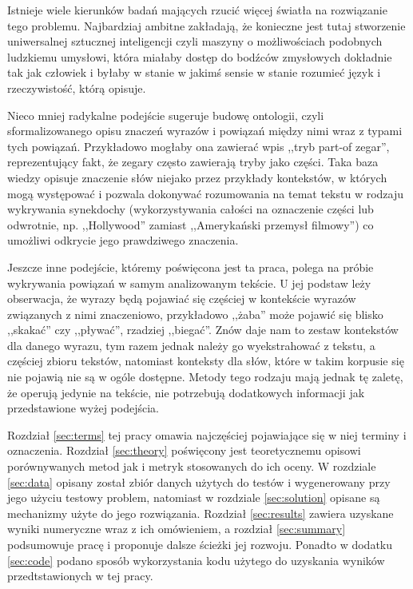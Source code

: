 \documentclass[11pt,a4paper]{article}
\begin{document}
Istnieje wiele kierunków badań mających rzucić więcej światła na rozwiązanie
tego problemu. Najbardziaj ambitne zakładają, że konieczne jest tutaj
stworzenie uniwersalnej sztucznej inteligencji czyli maszyny o możliwościach
podobnych ludzkiemu umysłowi, która miałaby dostęp do bodźców zmysłowych
dokładnie tak jak człowiek i byłaby w stanie w jakimś sensie w stanie rozumieć
język i rzeczywistość, którą opisuje.

Nieco mniej radykalne podejście sugeruje budowę ontologii, czyli
sformalizowanego opisu znaczeń wyrazów i powiązań między nimi wraz z typami
tych powiązań. Przykładowo mogłaby ona zawierać wpis ,,tryb part-of zegar'',
reprezentujący fakt, że zegary często zawierają tryby jako części. Taka baza
wiedzy opisuje znaczenie słów niejako przez przykłady kontekstów, w których
mogą występować i pozwala dokonywać rozumowania na temat tekstu w rodzaju
wykrywania synekdochy (wykorzystywania całości na oznaczenie części lub
odwrotnie, np. ,,Hollywood'' zamiast ,,Amerykański przemysł filmowy'') co
umożliwi odkrycie jego prawdziwego znaczenia.

Jeszcze inne podejście, któremy poświęcona jest ta praca, polega na próbie
wykrywania powiązań w samym analizowanym tekście. U jej podstaw leży
obserwacja, że wyrazy będą pojawiać się częściej w kontekście wyrazów
związanych z nimi znaczeniowo, przykładowo ,,żaba'' może pojawić się blisko
,,skakać'' czy ,,pływać'', rzadziej ,,biegać''. Znów daje nam to zestaw
kontekstów dla danego wyrazu, tym razem jednak należy go wyekstrahować z
tekstu, a częściej zbioru tekstów, natomiast konteksty dla słów, które w takim
korpusie się nie pojawią nie są w ogóle dostępne. Metody tego rodzaju mają
jednak tę zaletę, że operują jedynie na tekście, nie potrzebują dodatkowych
informacji jak przedstawione wyżej podejścia.

Rozdział \ref{sec:terms} tej pracy omawia najczęściej pojawiające się w niej
terminy i oznaczenia.  Rozdział \ref{sec:theory} poświęcony jest teoretycznemu
opisowi porównywanych metod jak i metryk stosowanych do ich oceny. W rozdziale
\ref{sec:data} opisany został zbiór danych użytych do testów i wygenerowany
przy jego użyciu testowy problem, natomiast w rozdziale \ref{sec:solution}
opisane są mechanizmy użyte do jego rozwiązania. Rozdział \ref{sec:results}
zawiera uzyskane wyniki numeryczne wraz z ich omówieniem, a rozdział
\ref{sec:summary} podsumowuje pracę i proponuje dalsze ścieżki jej rozwoju.
Ponadto w dodatku \ref{sec:code} podano sposób wykorzystania kodu użytego do
uzyskania wyników przedtstawionych w tej pracy.
\end{document}
